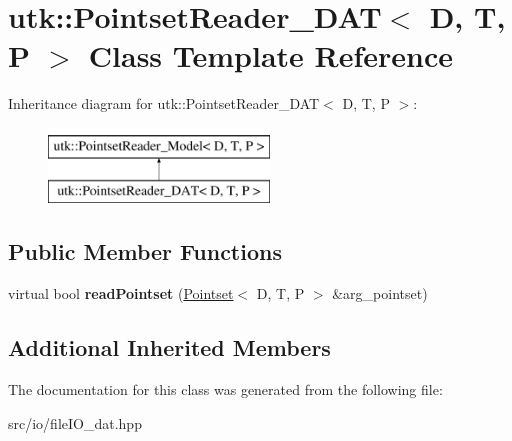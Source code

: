 \hypertarget{classutk_1_1PointsetReader__DAT}{\section{utk\-:\-:Pointset\-Reader\-\_\-\-D\-A\-T$<$ D, T, P $>$ Class Template Reference}
\label{classutk_1_1PointsetReader__DAT}
}
Inheritance diagram for utk\-:\-:Pointset\-Reader\-\_\-\-D\-A\-T$<$ D, T, P $>$\-:\begin{figure}[H]
\begin{center}
\leavevmode
\includegraphics[height=2.000000cm]{classutk_1_1PointsetReader__DAT}
\end{center}
\end{figure}
\subsection*{Public Member Functions}
\begin{DoxyCompactItemize}
\item 
\hypertarget{classutk_1_1PointsetReader__DAT_afd4cf6ee03a955fdaa828f4cacbf1c14}{virtual bool {\bfseries read\-Pointset} (\hyperlink{classutk_1_1Pointset}{Pointset}$<$ D, T, P $>$ \&arg\-\_\-pointset)}\label{classutk_1_1PointsetReader__DAT_afd4cf6ee03a955fdaa828f4cacbf1c14}

\end{DoxyCompactItemize}
\subsection*{Additional Inherited Members}


The documentation for this class was generated from the following file\-:\begin{DoxyCompactItemize}
\item 
src/io/file\-I\-O\-\_\-dat.\-hpp\end{DoxyCompactItemize}
